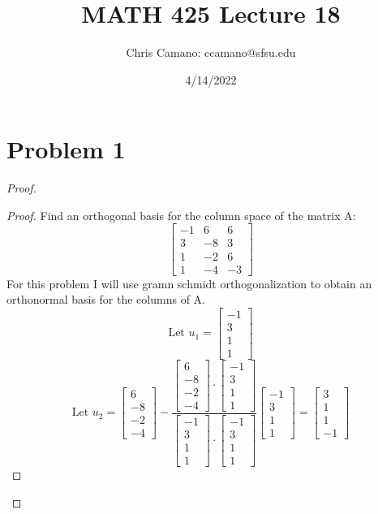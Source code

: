 \documentclass[12pt]{article}
\author{Chris Camano: ccamano@sfsu.edu}
\title{MATH 425  Lecture 18 }
\date{4/14/2022}
\newcommand{\sect}[1]{\section*{#1}}
\begin{document}
\maketitle

\sect{Problem 1}
\begin{proof}
  \begin{proof}
    Find an orthogonal basis for the column space of the matrix A:
    \[
      \begin{bmatrix}
        -1&6&6\\3&-8&3\\1&-2&6\\1&-4&-3
      \end{bmatrix}
    \]
    For this problem I will use gramn schmidt orthogonalization to obtain an orthonormal basis for the columns of A.
    \[
      \text{Let }u_1=\begin{bmatrix}
        -1\\3\\1\\1
    \end{bmatrix}
    \]
    \[
      \text{Let }u_2=\begin{bmatrix}
        6\\-8\\-2\\-4
    \end{bmatrix}-
    \frac{  \begin{bmatrix}
      6\\-8\\-2\\-4
  \end{bmatrix}\cdot \begin{bmatrix}
        -1\\3\\1\\1
    \end{bmatrix}}{\begin{bmatrix}
      -1\\3\\1\\1
  \end{bmatrix} \cdot \begin{bmatrix}
      -1\\3\\1\\1
  \end{bmatrix}}\begin{bmatrix}
      -1\\3\\1\\1
  \end{bmatrix}=\begin{bmatrix}
    3\\1\\1\\-1
  \end{bmatrix}
    \]


\end{proof}
\end{proof}
\end{document}
